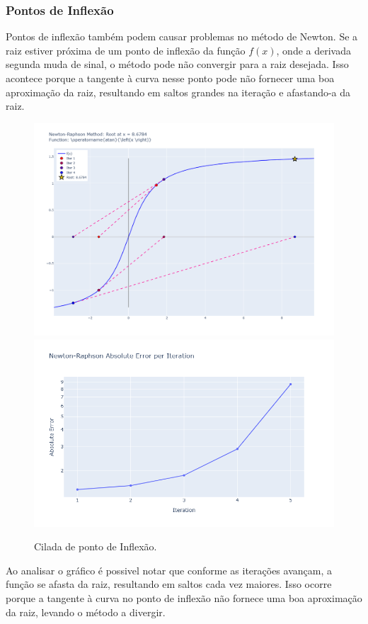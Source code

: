 \subsubsection{Pontos de Inflexão}
Pontos de inflexão também podem causar problemas no método de Newton. Se a raiz estiver próxima de um ponto de inflexão da função \(f(x)\), onde a derivada segunda muda de sinal, o método pode não convergir para a raiz desejada. Isso acontece porque a tangente à curva nesse ponto pode não fornecer uma boa aproximação da raiz, resultando em saltos grandes na iteração e afastando-a da raiz.
\begin{figure}[H]
    \centering 
    \includegraphics[width=1\textwidth]{Imagens/pitfalls/04/arctg.png}
    \includegraphics[width=1\textwidth]{Imagens/pitfalls/04/err_arctg.png}
    \caption{Cilada de ponto de Inflexão.}
    \label{fig:ciladaPontoInflexao}
\end{figure}
Ao analisar o gráfico é possivel notar que conforme as iterações avançam, a função se afasta da raiz, resultando em saltos cada vez maiores. Isso ocorre porque a tangente à curva no ponto de inflexão não fornece uma boa aproximação da raiz, levando o método a divergir.

